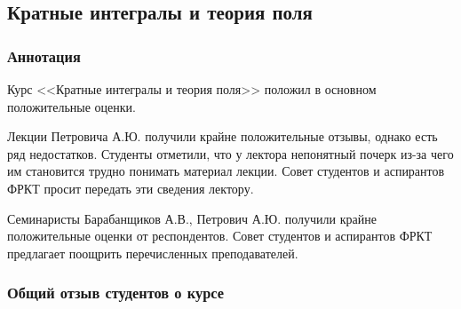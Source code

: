 \subsection{Кратные интегралы и теория поля}
	
	\subsubsection{Аннотация}

	Курс <<Кратные интегралы и теория поля>> положил в основном положительные оценки.
	
	Лекции Петровича А.Ю. получили крайне положительные отзывы, однако есть ряд недостатков. Студенты отметили, что у лектора непонятный почерк из-за чего им становится трудно понимать материал лекции. Совет студентов и аспирантов ФРКТ просит передать эти сведения лектору.

	Семинаристы Барабанщиков А.В., Петрович А.Ю. получили крайне положительные оценки от респондентов. Совет студентов и аспирантов ФРКТ предлагает поощрить перечисленных преподавателей.


	\subsubsection{Общий отзыв студентов о курсе}

